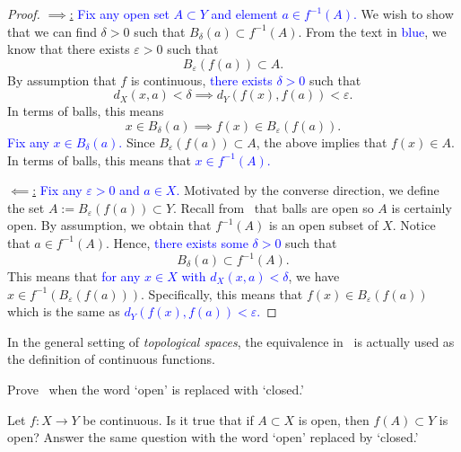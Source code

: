 \begin{proof}
	\ul{$\implies$:} \textcolor{blue}{Fix any open set $A\subset Y$ and element $a \in f^{-1}(A)$.} We wish to show that we can find $\delta>0$ such that $B_\delta(a) \subset f^{-1}(A)$. From the text in \textcolor{blue}{blue}, we know that there exists $\varepsilon>0$ such that
	\[
	B_\varepsilon(f(a))\subset A.
	\]
	By assumption that $f$ is continuous, \textcolor{blue}{there exists $\delta>0$} such that
	\[
	d_X(x,a)<\delta \implies d_Y(f(x),f(a))<\varepsilon.
	\]
	In terms of balls, this means
	\[
	x\in B_\delta(a)\implies f(x) \in B_\varepsilon(f(a)).
	\]
	\textcolor{blue}{Fix any $x\in B_\delta(a)$.} Since $B_\varepsilon(f(a))\subset A$, the above implies that $f(x) \in A$. In terms of balls, this means that \textcolor{blue}{$x \in f^{-1}(A)$.}
	
	\ul{$\impliedby$:} \textcolor{blue}{Fix any $\varepsilon>0$ and $a\in X$.} Motivated by the converse direction, we define the set $A:= B_\varepsilon(f(a))\subset Y$. Recall from~ that balls are open so $A$ is certainly open. By assumption, we obtain that $f^{-1}(A)$ is an open subset of $X$. Notice that $a\in f^{-1}(A)$. Hence, \textcolor{blue}{there exists some $\delta>0$} such that
	\[
	B_\delta(a) \subset f^{-1}(A).
	\]
	This means that \textcolor{blue}{for any $x\in X$ with $d_X(x,a)<\delta$}, we have $x \in f^{-1}(B_\varepsilon(f(a)))$. Specifically, this means that $f(x) \in B_\varepsilon(f(a))$ which is the same as \textcolor{blue}{$d_Y(f(x),f(a))<\varepsilon$.}
\end{proof}
\begin{rem}
	In the general setting of \textit{topological spaces}, the equivalence in~ is actually used as the definition of continuous functions.
\end{rem}
\begin{ex}
	Prove~ when the word `open' is replaced with `closed.'
\end{ex}
\begin{ex}
	\label{ex:cts_im}
	Let $f:X\to Y$ be continuous. Is it true that if $A\subset X$ is open, then $f(A)\subset Y$ is open? Answer the same question with the word `open' replaced by `closed.'
\end{ex}